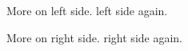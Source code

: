 \documentclass[12pt]{article}
\begin{document}
\begin{pages}
  \begin{Leftside}
    \beginnumbering
    \pstart
      More on  left side. \lipsum[1-3] %
    \pend
    \pstart
       left side again.\lipsum[4-7] %
    \pend
    \endnumbering
  \end{Leftside}
  \begin{Rightside}
    \beginnumbering
    \pstart
      More on  right side. \lipsum[1-3] %
    \pend
    \pstart
       right side again.\lipsum[4-7] %
    \pend
    \endnumbering
  \end{Rightside}
\end{pages}
\Pages
\end{document}
